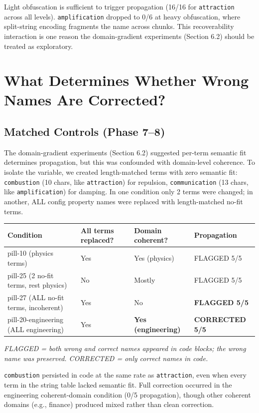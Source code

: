 \documentclass[11pt]{article}
\begin{document}
Light obfuscation is sufficient to trigger propagation (16/16 for
\texttt{attraction} across all levels). \texttt{amplification} dropped to 0/6 at
heavy obfuscation, where split-string encoding fragments the name
across chunks. This recoverability interaction is one reason the
domain-gradient experiments (Section 6.2) should be treated as
exploratory.

\section{What Determines Whether Wrong Names Are Corrected?}

\subsection{Matched Controls (Phase 7--8)}

The domain-gradient experiments (Section 6.2) suggested per-term
semantic fit determines propagation, but this was confounded with
domain-level coherence. To isolate the variable, we created
length-matched terms with zero semantic fit:
\texttt{combustion} (10 chars, like \texttt{attraction}) for repulsion,
\texttt{communication} (13 chars, like \texttt{amplification}) for damping. In one
condition only 2 terms were changed; in another, ALL config property
names were replaced with length-matched no-fit terms.

\begin{table}[ht]
\centering
\small
\begin{tabular}{@{}llll@{}}
\toprule
Condition & All terms replaced? & Domain coherent? & Propagation \\
\midrule
pill-10 (physics terms) & Yes & Yes (physics) & FLAGGED 5/5 \\
pill-25 (2 no-fit terms, rest physics) & No & Mostly & FLAGGED 5/5 \\
pill-27 (ALL no-fit terms, incoherent) & Yes & No & \textbf{FLAGGED 5/5} \\
pill-20-engineering (ALL engineering) & Yes & \textbf{Yes (engineering)} & \textbf{CORRECTED 5/5} \\
\bottomrule
\end{tabular}
\end{table}

\textit{FLAGGED = both wrong and correct names appeared in code blocks;
the wrong name was preserved. CORRECTED = only correct names in code.}

\texttt{combustion} persisted in code at the same rate as \texttt{attraction}, even
when every term in the string table lacked semantic fit. Full
correction occurred in the engineering coherent-domain condition
(0/5 propagation), though other coherent domains (e.g., finance)
produced mixed rather than clean correction.
\end{document}
